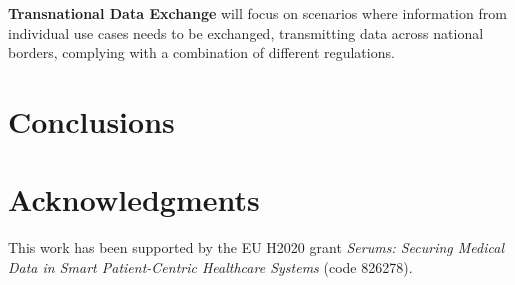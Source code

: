 \documentclass[sigconf]{acmart}
\begin{document}
\textbf{Transnational Data Exchange} will focus on scenarios where information from individual use cases needs to be exchanged, transmitting data across national borders, complying with a combination of different regulations.

\section{Conclusions}

\section*{Acknowledgments}
This work has been supported by the EU H2020 grant \emph{Serums: Securing Medical Data in Smart Patient-Centric Healthcare Systems} (code 826278).
\end{document}
